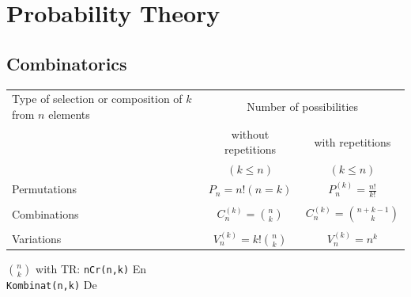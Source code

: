 
\section{Probability Theory}
    \subsection{Combinatorics}
        \begin{minipage}{13.5cm}
        \begin{tabular}{| p{5.5cm} | c | c |}
            \hline
            Type of selection or composition of $k$ from $n$ elements    & \multicolumn{2}{c|}{Number of possibilities}\\
             & without repetitions        & with repetitions\\
             & $(k\leq n)$                & $(k\leq n)$ \\
             \hline
            Permutations & $P_n=n!(n=k)$ &
            $P_n^{(k)}=\frac{n!}{k!}$ \\ & &\\
            Combinations & $C_n^{(k)}=\binom n k$ &
            $C_n^{(k)}=\binom{n+k-1} k$\\
            & &\\
            Variations & $V_n^{(k)}=k!\binom n k$ & $V_n^{(k)}=n^k$\\
            \hline
        \end{tabular}
        \end{minipage}
        \begin{minipage}{5cm}
        $\binom n k$ with TR: \texttt{nCr(n,k)} \hspace{9.3mm}En\\
        \hspace*{19mm} \texttt{Kombinat(n,k)} De
        \end{minipage}
